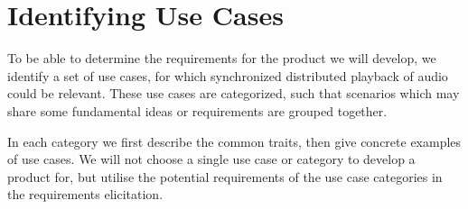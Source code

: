 \chapter{Identifying Use Cases}
\label{cha:identifying_use_cases}
To be able to determine the requirements for the product we will develop, we identify a set of use cases, for which synchronized distributed playback of audio could be relevant.
These use cases are categorized, such that scenarios which may share some fundamental ideas or requirements are grouped together.

In each category we first describe the common traits, then give concrete examples of use cases.
We will not choose a single use case or category to develop a product for, but utilise the potential requirements of the use case categories in the requirements elicitation.


